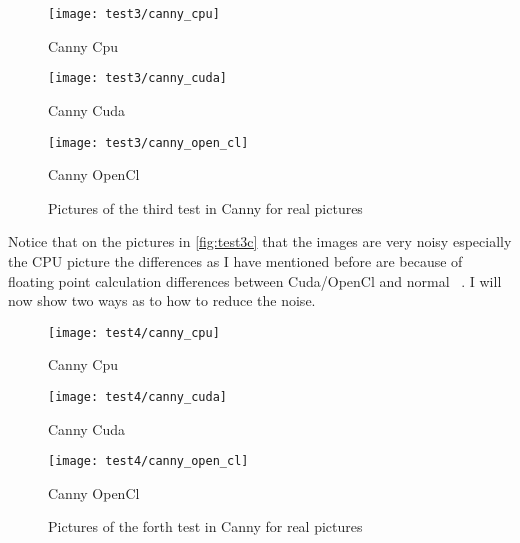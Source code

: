 \begin{figure}[H]
\centering
\begin{minipage}[t]{.325\textwidth}
\centering
\texttt{[image: test3/canny\_cpu]}
\addtocounter{figure}{-1}
\captionsetup{labelformat=empty}
\caption[]{Canny Cpu}
\end{minipage}
\begin{minipage}[t]{.325\textwidth}
\centering
\texttt{[image: test3/canny\_cuda]}
\addtocounter{figure}{-1}
\captionsetup{labelformat=empty}
\caption[]{Canny Cuda}
\end{minipage}
\begin{minipage}[t]{.325\textwidth}
\centering
\texttt{[image: test3/canny\_open\_cl]}
\addtocounter{figure}{-1}
\captionsetup{labelformat=empty}
\caption[]{Canny OpenCl}
\end{minipage}
\caption{Pictures of the third test in \ac{Canny} for real pictures}
\label{fig:test3c}
\end{figure}

Notice that on the pictures in \autoref{fig:test3c} that the images are very noisy especially the \ac{CPU} picture the differences as I have mentioned before are because of floating point calculation differences between Cuda/OpenCl and normal \CC\ . I will now show two ways as to how to reduce the noise.

\begin{figure}[H]
\centering
\begin{minipage}[t]{.325\textwidth}
\centering
\texttt{[image: test4/canny\_cpu]}
\addtocounter{figure}{-1}
\captionsetup{labelformat=empty}
\caption[]{Canny Cpu}
\end{minipage}
\begin{minipage}[t]{.325\textwidth}
\centering
\texttt{[image: test4/canny\_cuda]}
\addtocounter{figure}{-1}
\captionsetup{labelformat=empty}
\caption[]{Canny Cuda}
\end{minipage}
\begin{minipage}[t]{.325\textwidth}
\centering
\texttt{[image: test4/canny\_open\_cl]}
\addtocounter{figure}{-1}
\captionsetup{labelformat=empty}
\caption[]{Canny OpenCl}
\end{minipage}
\caption{Pictures of the forth test in \ac{Canny} for real pictures}
\label{fig:test4c}
\end{figure}

